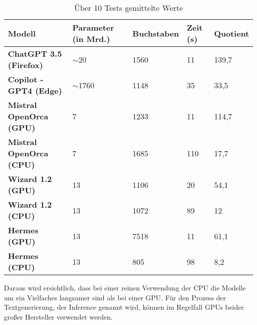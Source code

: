 \documentclass[german,report]{i1thesis}
\begin{document}
\begin{table}[H]
    \centering
    \begin{tabular}{|l|l|l|l|l|}
        \hline
        \textbf{Modell}                                              & \textbf{Parameter (in Mrd.)}            & \textbf{Buchstaben} & \textbf{Zeit (s)} & \textbf{Quotient} \\ \hline
        \textbf{ChatGPT 3.5 (Firefox) \autocite{openai_chatgpt}}     & $\sim$20 \autocite{singh2023codefusion} & 1560                & 11                & 139,7             \\ \hline
        \textbf{Copilot - GPT4 (Edge) \autocite{microsoft_copilot}}  & $\sim$1760 \autocite{decoder2024gpt4}   & 1148                & 35                & 33,5              \\ \hline
        \textbf{Mistral OpenOrca (\ac{GPU}) \autocite{OpenOrca2023}} & 7                                       & 1233                & 11                & 114,7             \\ \hline
        \textbf{Mistral OpenOrca (\ac{CPU}) \autocite{OpenOrca2023}} & 7                                       & 1685                & 110               & 17,7              \\ \hline
        \textbf{Wizard 1.2 (\ac{GPU}) \autocite{WizardLM2023}}       & 13                                      & 1106                & 20                & 54,1              \\ \hline
        \textbf{Wizard 1.2 (\ac{CPU}) \autocite{WizardLM2023}}       & 13                                      & 1072                & 89                & 12                \\ \hline
        \textbf{Hermes (\ac{GPU}) \autocite{NousResearch2023}}       & 13                                      & 7518                & 11                & 61,1              \\ \hline
        \textbf{Hermes (\ac{CPU}) \autocite{NousResearch2023}}       & 13                                      & 805                 & 98                & 8,2               \\ \hline
    \end{tabular}
    \caption{Über 10 Tests gemittelte Werte}
\end{table}

Daraus wird ersichtlich, dass bei einer reinen Verwendung der \ac{CPU} die Modelle um ein Vielfaches langsamer sind als bei einer \ac{GPU}.
Für den Prozess der Textgenerierung, der Inference genannt wird, können im Regelfall \acp{GPU} beider großer Hersteller verwendet werden.
\end{document}
